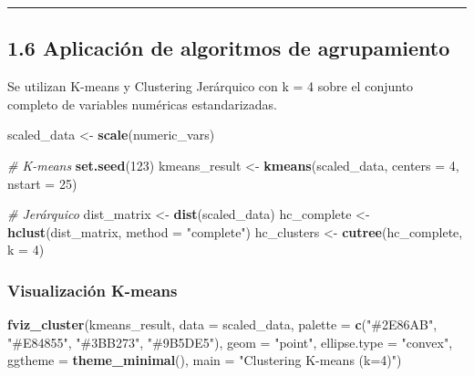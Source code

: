 \documentclass[
]{article}
\newenvironment{Shaded}{\begin{snugshade}}{\end{snugshade}}
\newcommand{\AttributeTok}[1]{\textcolor[rgb]{0.13,0.29,0.53}{#1}}
\newcommand{\CommentTok}[1]{\textcolor[rgb]{0.56,0.35,0.01}{\textit{#1}}}
\newcommand{\DecValTok}[1]{\textcolor[rgb]{0.00,0.00,0.81}{#1}}
\newcommand{\FunctionTok}[1]{\textcolor[rgb]{0.13,0.29,0.53}{\textbf{#1}}}
\newcommand{\NormalTok}[1]{#1}
\newcommand{\OtherTok}[1]{\textcolor[rgb]{0.56,0.35,0.01}{#1}}
\newcommand{\StringTok}[1]{\textcolor[rgb]{0.31,0.60,0.02}{#1}}
\begin{document}
\begin{center}\rule{0.5\linewidth}{0.5pt}\end{center}

\subsection{1.6 Aplicación de algoritmos de
agrupamiento}\label{aplicaciuxf3n-de-algoritmos-de-agrupamiento}

Se utilizan K-means y Clustering Jerárquico con k = 4 sobre el conjunto
completo de variables numéricas estandarizadas.

\begin{Shaded}
\begin{Highlighting}[]
\NormalTok{scaled\_data }\OtherTok{\textless{}{-}} \FunctionTok{scale}\NormalTok{(numeric\_vars)}

\CommentTok{\# K{-}means}
\FunctionTok{set.seed}\NormalTok{(}\DecValTok{123}\NormalTok{)}
\NormalTok{kmeans\_result }\OtherTok{\textless{}{-}} \FunctionTok{kmeans}\NormalTok{(scaled\_data, }\AttributeTok{centers =} \DecValTok{4}\NormalTok{, }\AttributeTok{nstart =} \DecValTok{25}\NormalTok{)}

\CommentTok{\# Jerárquico}
\NormalTok{dist\_matrix }\OtherTok{\textless{}{-}} \FunctionTok{dist}\NormalTok{(scaled\_data)}
\NormalTok{hc\_complete }\OtherTok{\textless{}{-}} \FunctionTok{hclust}\NormalTok{(dist\_matrix, }\AttributeTok{method =} \StringTok{"complete"}\NormalTok{)}
\NormalTok{hc\_clusters }\OtherTok{\textless{}{-}} \FunctionTok{cutree}\NormalTok{(hc\_complete, }\AttributeTok{k =} \DecValTok{4}\NormalTok{)}
\end{Highlighting}
\end{Shaded}

\subsubsection{Visualización K-means}\label{visualizaciuxf3n-k-means}

\begin{Shaded}
\begin{Highlighting}[]
\FunctionTok{fviz\_cluster}\NormalTok{(kmeans\_result, }\AttributeTok{data =}\NormalTok{ scaled\_data,}
             \AttributeTok{palette =} \FunctionTok{c}\NormalTok{(}\StringTok{"\#2E86AB"}\NormalTok{, }\StringTok{"\#E84855"}\NormalTok{, }\StringTok{"\#3BB273"}\NormalTok{, }\StringTok{"\#9B5DE5"}\NormalTok{),}
             \AttributeTok{geom =} \StringTok{"point"}\NormalTok{,}
             \AttributeTok{ellipse.type =} \StringTok{"convex"}\NormalTok{,}
             \AttributeTok{ggtheme =} \FunctionTok{theme\_minimal}\NormalTok{(),}
             \AttributeTok{main =} \StringTok{"Clustering K{-}means (k=4)"}\NormalTok{)}
\end{Highlighting}
\end{Shaded}
\end{document}
